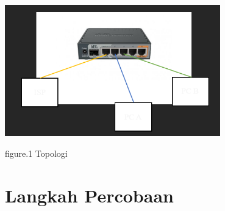 \begin{center}
    \includegraphics[width=0.7\textwidth]{image/P3/Topologi.png}    
    
    figure.1 Topologi
\end{center}


\section{Langkah Percobaan}
